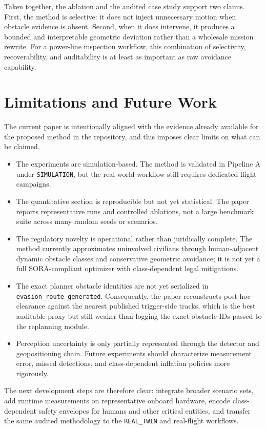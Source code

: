 \documentclass[a4paper,11pt]{article}
\begin{document}
Taken together, the ablation and the audited case study support two claims. First, the method is selective: it does not inject unnecessary motion when obstacle evidence is absent. Second, when it does intervene, it produces a bounded and interpretable geometric deviation rather than a wholesale mission rewrite. For a power-line inspection workflow, this combination of selectivity, recoverability, and auditability is at least as important as raw avoidance capability.

\section{Limitations and Future Work}

The current paper is intentionally aligned with the evidence already available for the proposed method in the repository, and this imposes clear limits on what can be claimed.
\begin{itemize}[leftmargin=1.3em]
    \item The experiments are simulation-based. The method is validated in Pipeline A under \texttt{SIMULATION}, but the real-world workflow still requires dedicated flight campaigns.
    \item The quantitative section is reproducible but not yet statistical. The paper reports representative runs and controlled ablations, not a large benchmark suite across many random seeds or scenarios.
    \item The regulatory novelty is operational rather than juridically complete. The method currently approximates uninvolved civilians through human-adjacent dynamic obstacle classes and conservative geometric avoidance; it is not yet a full SORA-compliant optimizer with class-dependent legal mitigations.
    \item The exact planner obstacle identities are not yet serialized in \texttt{evasion\_route\_generated}. Consequently, the paper reconstructs post-hoc clearance against the nearest published trigger-side tracks, which is the best auditable proxy but still weaker than logging the exact obstacle IDs passed to the replanning module.
    \item Perception uncertainty is only partially represented through the detector and geopositioning chain. Future experiments should characterize measurement error, missed detections, and class-dependent inflation policies more rigorously.
\end{itemize}

The next development steps are therefore clear: integrate broader scenario sets, add runtime measurements on representative onboard hardware, encode class-dependent safety envelopes for humans and other critical entities, and transfer the same audited methodology to the \texttt{REAL\_TWIN} and real-flight workflows.
\end{document}
